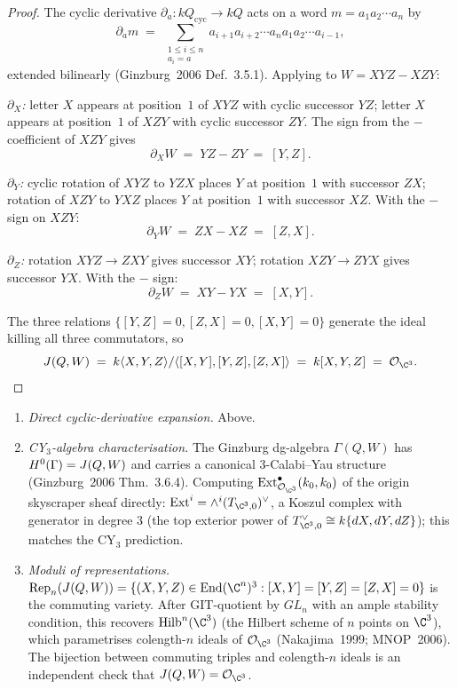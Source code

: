 \begin{proof}
The cyclic derivative $\partial_a: kQ_{\mathrm{cyc}} \to kQ$ acts on a word
$m = a_1 a_2 \cdots a_n$ by
\[
 \partial_a m \;=\; \sum_{\substack{1 \leq i \leq n \\ a_i = a}}
 a_{i+1} a_{i+2} \cdots a_n a_1 a_2 \cdots a_{i-1},
\]
extended bilinearly (Ginzburg~2006 Def.~3.5.1). Applying to $W = XYZ - XZY$:

\emph{$\partial_X$:} letter $X$ appears at position~$1$ of $XYZ$ with cyclic
successor $YZ$; letter $X$ appears at position~$1$ of $XZY$ with cyclic successor
$ZY$. The sign from the $-$ coefficient of $XZY$ gives
\[
 \partial_X W \;=\; YZ - ZY \;=\; [Y, Z].
\]

\emph{$\partial_Y$:} cyclic rotation of $XYZ$ to $YZX$ places $Y$ at position~$1$
with successor $ZX$; rotation of $XZY$ to $YXZ$ places $Y$ at position~$1$ with
successor $XZ$. With the $-$ sign on $XZY$:
\[
 \partial_Y W \;=\; ZX - XZ \;=\; [Z, X].
\]

\emph{$\partial_Z$:} rotation $XYZ \to ZXY$ gives successor $XY$;
rotation $XZY \to ZYX$ gives successor $YX$. With the $-$ sign:
\[
 \partial_Z W \;=\; XY - YX \;=\; [X, Y].
\]

The three relations $\{[Y, Z] = 0, [Z, X] = 0, [X, Y] = 0\}$ generate the ideal
killing all three commutators, so
\[
 \Jac(Q, W) \;=\; k\langle X, Y, Z\rangle / \langle [X, Y], [Y, Z], [Z, X]\rangle
 \;=\; k[X, Y, Z] \;=\; \mathcal{O}_{\C^3}.
\]
\end{proof}

\begin{verification}
\label{w17:verif:jacobi-c3}\mbox{}
\begin{enumerate}
\item \emph{Direct cyclic-derivative expansion.} Above.
\item \emph{CY$_3$-algebra characterisation.} The Ginzburg dg-algebra
$\Gamma(Q, W)$ has $H^0(\Gamma) = J(Q, W)$ and carries a canonical
3-Calabi--Yau structure (Ginzburg~2006 Thm.~3.6.4). Computing
$\mathrm{Ext}^\bullet_{\mathcal{O}_{\C^3}}(k_0, k_0)$ of the origin skyscraper
sheaf directly:
$\mathrm{Ext}^i = \wedge^i (T_{\C^3, 0})^\vee$, a Koszul complex with generator
in degree $3$ (the top exterior power of $T^\vee_{\C^3, 0} \cong k\{dX, dY, dZ\}$);
this matches the CY$_3$ prediction.
\item \emph{Moduli of representations.} $\mathrm{Rep}_n(\Jac(Q, W)) = \{(X, Y, Z) \in
\mathrm{End}(\C^n)^3 : [X, Y] = [Y, Z] = [Z, X] = 0\}$ is the commuting variety.
After GIT-quotient by $GL_n$ with an ample stability condition, this recovers
$\Hilb^n(\C^3)$ (the Hilbert scheme of $n$ points on $\C^3$), which parametrises
colength-$n$ ideals of $\mathcal{O}_{\C^3}$ (Nakajima~1999; MNOP~2006). The
bijection between commuting triples and colength-$n$ ideals is an independent
check that $\Jac(Q, W) = \mathcal{O}_{\C^3}$.
\end{enumerate}
\end{verification}

